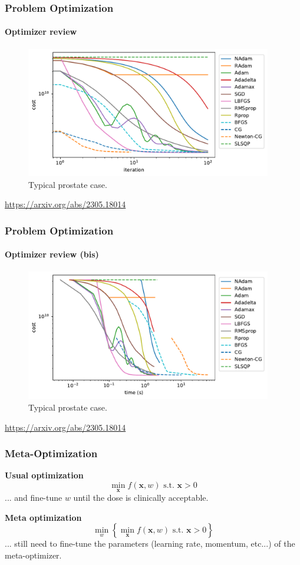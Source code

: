 \documentclass{beamer}
\begin{document}
	\begin{frame}
		\frametitle{Problem Optimization}
		\framesubtitle{Optimizer review}
		
		\begin{figure}
			\includegraphics[width=10.75cm]{figures/ICMProstate-iter.pdf}
			\caption{Typical prostate case.}
		\end{figure}
		
		\url{https://arxiv.org/abs/2305.18014}
		
	\end{frame}
	
	\begin{frame}
		\frametitle{Problem Optimization}
		\framesubtitle{Optimizer review (bis)}
		
		\begin{figure}
			\includegraphics[width=10.75cm]{figures/ICMProstate-time.pdf}
			\caption{Typical prostate case.}
		\end{figure}
		
		\url{https://arxiv.org/abs/2305.18014}
	
	\end{frame}
	
	\begin{frame}
		\frametitle{Meta-Optimization}
		\textbf{Usual optimization}
		$$\min_{\textbf{x}} f(\textbf{x}, w) \text{ s.t. } \textbf{x} > 0$$
		... and fine-tune $w$ until the dose is clinically acceptable.
		
		\vspace{0.5cm}
		
		\textbf{Meta optimization}
		$$\min_w \left\lbrace \min_{\textbf{x}} f(\textbf{x}, w) \text{ s.t. } \textbf{x} > 0 \right\rbrace $$
		... still need to fine-tune the parameters (learning rate, momentum, etc...) of the meta-optimizer.
		
	\end{frame}
	
\end{document}
